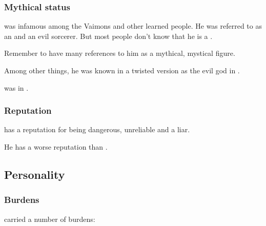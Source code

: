 \subsubsection{Mythical status}
\Ishna{} was infamous among the Vaimons and other learned people. 
He was referred to as an  and an evil \chaos{} sorcerer. 
But most people don't know that he is a \dragon. 

Remember to have many references to him as a mythical, mystical figure. 

Among other things, he was known in a twisted version as the evil god  in .

\Ishnaruchaefir was  in .





\subsubsection{Reputation}
\Ishnaruchaefir{} has a reputation for being dangerous, unreliable and a liar. 

He has a worse reputation than . 










\subsection{Personality}





\subsubsection{Burdens}
\Ishnaruchaefir carried a number of burdens:

